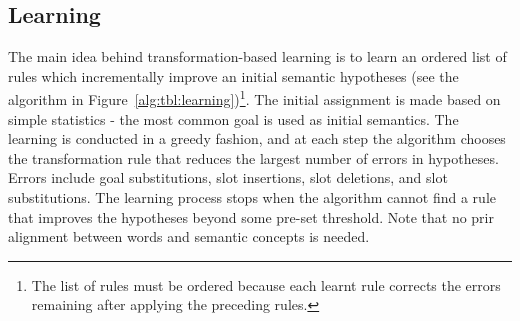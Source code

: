 \documentclass{article}
\begin{document}

\subsection{Learning} \label{sec:tbl:learning}
The main idea behind transformation-based learning \cite{brill95} is to learn an ordered list of rules which incrementally improve an initial semantic hypotheses (see the algorithm in Figure~\ref{alg:tbl:learning})\footnote{The list of rules must be ordered because each learnt rule corrects the errors remaining after applying the preceding rules.}. The initial assignment is made based on simple statistics - the most common goal is used as initial semantics. The learning is conducted in a greedy fashion, and at each step the algorithm chooses the transformation rule that reduces the largest number of errors in hypotheses. Errors include goal substitutions, slot insertions, slot deletions, and slot substitutions. The learning process stops when the algorithm cannot find a rule that improves the hypotheses beyond some pre-set threshold. Note that no prir alignment between words and semantic concepts is needed.
\end{document}
